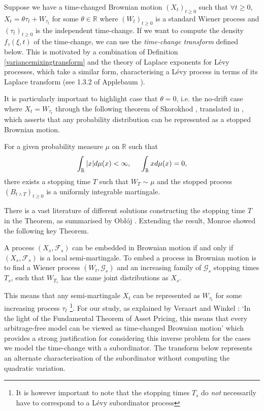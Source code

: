\documentclass{article}
\begin{document}
Suppose we have a time-changed Brownian motion $(X_t)_{t\geq0}$ such that $\forall t\geq0$, $X_t = \theta \tau_t + W_{\tau_t}$ for some $\theta\in\mathbb{R}$ where $(W_t)_{t\geq0}$ is a standard Wiener process and $(\tau_t)_{t\geq0}$ is the independent time-change. If we want to compute the density $f_{\tau}(\xi,t)$ of the time-change, we can use the \textit{time-change transform} defined below. This is motivated by a combination of Definition \ref{variancemixingtransform} and the theory of Laplace exponents for Lévy processes, which take a similar form, characterising a Lévy process in terms of its Laplace transform (see 1.3.2 of Applebaum \cite{Applebaum}).

It is particularly important to highlight case that $\theta = 0$, i.e. the no-drift case where $X_t = W_{\tau_t}$ through the following theorem of Skorokhod \cite{skororussia}, translated in \cite{skorokhod}, which asserts that any probability distribution can be represented as a stopped Brownian motion.

\begin{thm}\label{Skorothm}
    For a given probability measure $\mu$ on $\mathbb{R}$ such that $$\int_\mathbb{R} |x|d\mu(x) < \infty, \hspace{0.5cm} \int_\mathbb{R}xd\mu(x) = 0,$$
    there exists a stopping time $T$ such that $W_T \sim \mu$ and the stopped process $(B_{t\wedge T})_{t\geq0}$ is a uniformly integrable martingale.
\end{thm}
There is a vast literature of different solutions constructing the stopping time $T$ in the Theorem, as summarised by Obłój \cite{Obloj}. Extending the result, Monroe \cite{Monroe} showed the following key Theorem.
\begin{thm}\label{Monroethm}
    A process $(X_s, \mathcal{F}_s)$ can be embedded in Brownian motion if and only if $(X_s, \mathcal{F}_s)$ is a local semi-martingale. To embed a process in Brownian motion is to find a Wiener process $(W_t, \mathcal{G}_s)$ and an increasing family of $\mathcal{G}_s$ stopping times $T_s$, such that $W_{T_s}$ has the same joint distributions as $X_s$.
\end{thm}
This means that any semi-martingale $X_t$ can be represented as $W_{\tau_t}$ for some increasing process $\tau_t$ \footnote{It is however important to note that the stopping times $T_s$ do \textit{not} necessarily have to correspond to a Lévy subordinator process}. For our study, as explained by Veraart and Winkel \cite{VeraartWinkel}: `In the light of the Fundamental Theorem of Asset Pricing, this means that every arbitrage-free model can be viewed as time-changed Brownian motion' which provides a strong justification for considering this inverse problem for the cases we model the time-change with a subordinator. The transform below represents an alternate characterisation of the subordinator without computing the quadratic variation.
\end{document}
